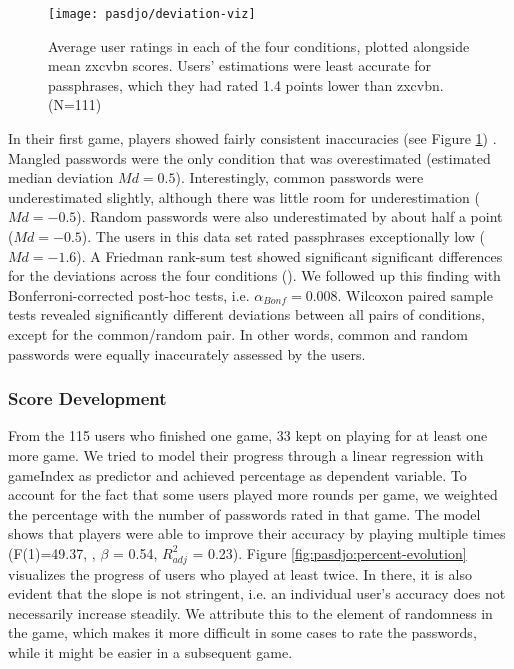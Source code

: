 \begin{figure}[tbp]
	\centering
	\texttt{[image: pasdjo/deviation-viz]}
	\caption{\label{fig:pasdjo:deviation-viz} Average user ratings in each of the four conditions, plotted alongside mean zxcvbn scores. Users' estimations were least accurate for passphrases, which they had rated 1.4 points lower than zxcvbn. (N=111) }
\end{figure}

In their first game, players showed fairly consistent inaccuracies (see Figure \ref{fig:pasdjo:deviation-viz}) . Mangled passwords were the only condition that was overestimated (estimated median deviation $Md=0.5$). Interestingly, common passwords were underestimated slightly, although there was little room for underestimation ($Md=-0.5$). Random passwords were also underestimated by about half a point ($Md=-0.5$). The users in this data set rated passphrases exceptionally low ($Md = -1.6$). A Friedman rank-sum test showed significant significant differences for the deviations across the four conditions (). We followed up this finding with Bonferroni-corrected post-hoc tests, i.e. $\alpha_{Bonf}=0.008$. Wilcoxon paired sample tests revealed significantly different deviations between all pairs of conditions, except for the common/random pair. In other words, common and random passwords were equally inaccurately assessed by the users. 

\subsubsection{Score Development}
From the 115 users who finished one game, 33 kept on playing for at least one more game. We tried to model their progress through a linear regression with gameIndex as predictor and achieved percentage as dependent variable. To account for the fact that some users played more rounds per game, we weighted the percentage with the number of passwords rated in that game. The model shows that players were able to improve their accuracy by playing multiple times (F(1)=49.37, , $\beta$ = 0.54, $R^2_{adj}$ = 0.23). Figure \ref{fig:pasdjo:percent-evolution} visualizes the progress of users who played at least twice. In there, it is also evident that the slope is not stringent, i.e. an individual user's accuracy does not necessarily increase steadily. We attribute this to the element of randomness in the game, which makes it more difficult in some cases to rate the passwords, while it might be easier in a subsequent game. 

